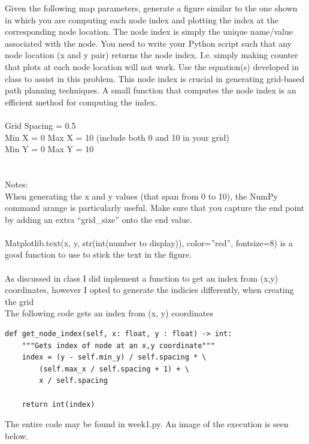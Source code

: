 \documentclass{article}
\begin{document}
Given the following map parameters, generate a figure similar to the one shown in which you are 
computing each node index and plotting the index at the corresponding node location. The node 
index is simply the unique name/value associated with the node. You need to write your Python 
script such that any node location (x and y pair) returns the node index. I.e. simply making counter 
that plots at each node location will not work. Use the equation(s) developed in class to assist in this 
problem. This node index is crucial in generating grid-based path planning techniques. A small 
function that computes the node index is an efficient method for computing the index. 
\\\\
Grid Spacing = 0.5\\
Min X = 0  Max X = 10 (include both 0 and 10 in your grid)\\
Min Y = 0  Max Y = 10\\
\\\\
Notes:
\\
When generating the x and y values (that span from 0 to 10), the NumPy command arange is 
particularly useful. Make sure that you capture the end point by adding an extra “grid\_size” onto the 
end value. 
\\\\
Matplotlib.text(x, y, str(int(number to display)), color=”red”, fontsize=8) is a good function to use to 
stick the text in the figure.
\\\\

As discussed in class I did inplement a function to get an index from (x,y) coordinates,
however I opted to generate the indicies differently, when creating the grid
\\
The following code gets an index from (x, y) coordinates
\begin{verbatim}
def get_node_index(self, x: float, y : float) -> int:
    """Gets index of node at an x,y coordinate"""    
    index = (y - self.min_y) / self.spacing * \
        (self.max_x / self.spacing + 1) + \
        x / self.spacing
    
    return int(index)
\end{verbatim}

\newpage
\noindent The entire code may be found in week1.py. An image of the execution is seen below.
\end{document}
